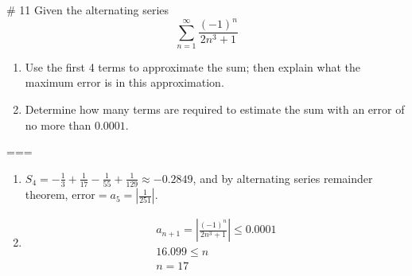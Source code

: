 # 11
Given the alternating series
\[\sum_{n=1}^\infty\frac{{(-1)}^n}{2n^3+1}\]
\begin{enumerate}
  \item Use the first 4 terms to approximate the sum; then explain what the
    maximum error is in this approximation.
  \item Determine how many terms are required to estimate the sum with an error
    of no more than \(0.0001\).
\end{enumerate}
===
\begin{enumerate}
  \item \(S_4=-\frac{1}{3}+\frac{1}{17}-\frac{1}{55}+\frac{1}{129}\approx
    -0.2849\), and by alternating series remainder theorem,
    \(\text{error}=a_5=\left|\frac{1}{251}\right|\).
  \item
    \begin{gather*}
      a_{n+1}=\left|\frac{{(-1)}^n}{2n^3+1}\right|\leq 0.0001\\
      16.099\leq n\\
      n=17
    \end{gather*}

\end{enumerate}
